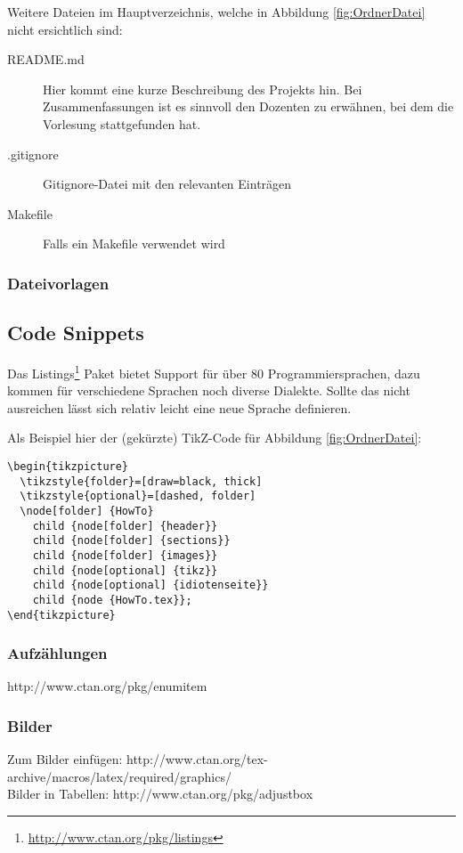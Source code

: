 Weitere Dateien im Hauptverzeichnis, welche in Abbildung \ref{fig:OrdnerDatei} nicht ersichtlich sind:
\begin{description}
  \item[README.md] Hier kommt eine kurze Beschreibung des Projekts hin. Bei Zusammenfassungen ist es sinnvoll den Dozenten zu erwähnen,
  	bei dem die Vorlesung stattgefunden hat.
  \item[.gitignore] Gitignore-Datei mit den relevanten Einträgen
  \item[Makefile]	Falls ein Makefile verwendet wird
\end{description}

\subsubsection{Dateivorlagen}


\subsection{Code Snippets}
Das Listings\footnote{\url{http://www.ctan.org/pkg/listings}} Paket bietet Support für über 80 Programmiersprachen, dazu kommen für verschiedene Sprachen noch diverse Dialekte. Sollte das nicht
ausreichen lässt sich relativ leicht eine neue Sprache definieren.

Als Beispiel hier der (gekürzte) TikZ-Code für Abbildung \ref{fig:OrdnerDatei}:
\begin{lstlisting}
\begin{tikzpicture}
  \tikzstyle{folder}=[draw=black, thick]
  \tikzstyle{optional}=[dashed, folder]
  \node[folder] {HowTo}
    child {node[folder] {header}}
    child {node[folder] {sections}}
    child {node[folder] {images}}
    child {node[optional] {tikz}}
    child {node[optional] {idiotenseite}}
    child {node {HowTo.tex}};
\end{tikzpicture}
\end{lstlisting}


\subsubsection{Aufzählungen}
http://www.ctan.org/pkg/enumitem

\subsubsection{Bilder}
Zum Bilder einfügen: http://www.ctan.org/tex-archive/macros/latex/required/graphics/ \\
Bilder in Tabellen: http://www.ctan.org/pkg/adjustbox

